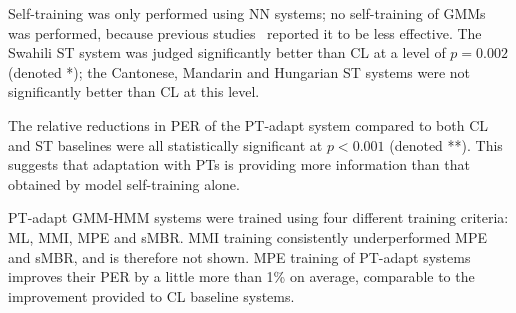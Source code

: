 Self-training was only performed
using NN systems; no self-training of GMMs was performed, because
previous studies~\cite{Huang2013} reported it to be less effective.
The Swahili {\sc ST} system was judged significantly better
than {\sc CL} at a level of $p=0.002$ (denoted *); the Cantonese,
Mandarin and
Hungarian {\sc ST} systems were not significantly better
than {\sc CL} at this level.

The relative reductions in PER
of the {\sc PT-adapt} system
compared to both {\sc CL} and {\sc ST} baselines
were all statistically
significant at $p<0.001$ (denoted **).  This suggests that adaptation
with PTs is providing more information than that obtained by model
self-training alone.

{\color{blue} PT-adapt GMM-HMM systems were trained using four
different training criteria: ML, MMI, MPE and sMBR.  MMI training
consistently underperformed MPE and sMBR, and is therefore not shown.
MPE training of {\sc PT-adapt} systems improves their PER by a little
more than 1\% on average, comparable to the improvement provided
to {\sc CL} baseline systems.}

